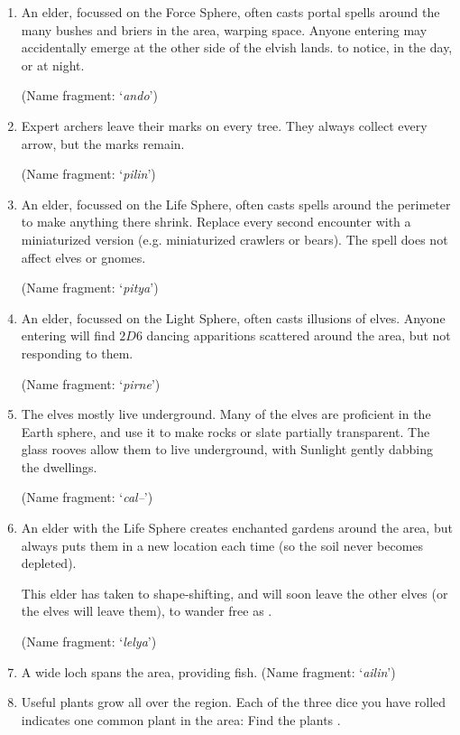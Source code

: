 \begin{multicols}{2}
\begin{exampletext}
\end{exampletext}

\begin{enumerate}
  \item
  An elder, focussed on the Force Sphere, often casts portal spells around the many bushes and briers in the area, warping space.
  Anyone entering may accidentally emerge at the other side of the elvish lands.
   to notice, \tn[7] in the day, or \tn[12] at night.

  (Name fragment: `\textit{ando}')
  \item
  Expert archers leave their marks on every tree.
  They always collect every arrow, but the marks remain.

  (Name fragment: `\textit{pilin}')
  \item
  An elder, focussed on the Life Sphere, often casts spells around the perimeter to make anything there shrink.
  Replace every second encounter with a miniaturized version (e.g. miniaturized \glspl{crawler} or bears).
  The spell does not affect elves or gnomes.

  (Name fragment: `\textit{pitya}')
  \item
  An elder, focussed on the Light Sphere, often casts illusions of elves.
  Anyone entering will find $2D6$ dancing apparitions scattered around the area, but not responding to them.

  (Name fragment: `\textit{pirne}')
  \item
  The elves mostly live underground.
  Many of the elves are proficient in the Earth \gls{sphere}, and use it to make rocks or slate partially transparent.
  The glass rooves allow them to live underground, with Sunlight gently dabbing the dwellings.

  (Name fragment: `\textit{cal--}')
  \ifodd\value{r3}
    \item
    An elder with the Life Sphere creates enchanted gardens around the area, but always puts them in a new location each time (so the soil never becomes depleted).

    This elder has taken to shape-shifting, and will soon leave the other elves (or the elves will leave them), to wander free as .

    (Name fragment: `\textit{lelya}')
  \else
    \item
    A wide loch spans the area, providing fish.
    (Name fragment: `\textit{ailin}')
  \fi
  \item
  Useful plants grow all over the region.
  Each of the three dice you have rolled indicates one common plant in the area:
  \randomPlants
  Find the plants .


\end{enumerate}
\end{multicols}

